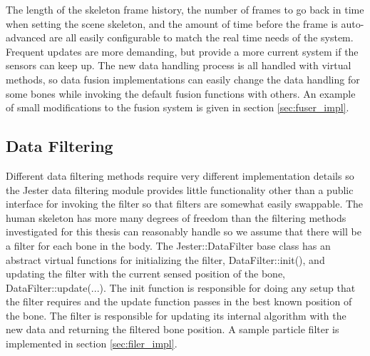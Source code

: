 The length of the skeleton frame history, the number of frames to go back in time when setting the scene skeleton, and the amount of time before the frame is auto-advanced are all easily configurable to match the real time needs of the system. Frequent updates are more demanding, but provide a more current system if the sensors can keep up. The new data handling process is all handled with virtual methods, so data fusion implementations can easily change the data handling for some bones while invoking the default fusion functions with others. An example of small modifications to the fusion system is given in section \ref{sec:fuser_impl}.
	
\subsection{Data Filtering}

Different data filtering methods require very different implementation details so the Jester data filtering module provides little functionality other than a public interface for invoking the filter so that filters are somewhat easily swappable. The human skeleton has more many degrees of freedom than the filtering methods investigated for this thesis can reasonably handle so we assume that there will be a filter for each bone in the body. The Jester::DataFilter base class has an abstract virtual functions for initializing the filter, DataFilter::init(), and updating the filter with the current sensed position of the bone, DataFilter::update(...). The init function is responsible for doing any setup that the filter requires and the update function passes in the best known position of the bone. The filter is responsible for updating its internal algorithm with the new data and returning the filtered bone position. A sample particle filter is implemented in section \ref{sec:filer_impl}.
